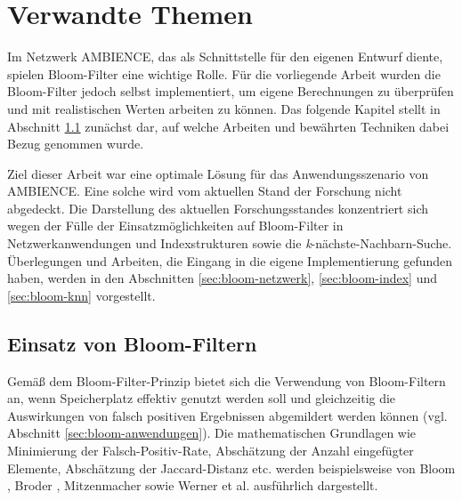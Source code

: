 \chapter{Verwandte Themen}\label{ch:related}
Im Netzwerk AMBIENCE, das als Schnittstelle für den eigenen Entwurf diente, spielen Bloom-Filter eine wichtige Rolle. Für die vorliegende Arbeit wurden die Bloom-Filter jedoch selbst implementiert, um eigene Berechnungen zu überprüfen und mit realistischen Werten arbeiten zu können. Das folgende Kapitel stellt in Abschnitt \ref{sec:bloom-implementierung} zunächst dar, auf welche Arbeiten und bewährten Techniken dabei Bezug genommen wurde. 

Ziel dieser Arbeit war eine optimale Lösung für das Anwendungsszenario von AMBIENCE. Eine solche wird vom aktuellen Stand der Forschung nicht abgedeckt. Die Darstellung des aktuellen Forschungsstandes konzentriert  sich wegen der Fülle der Einsatzmöglichkeiten auf Bloom-Filter in Netzwerkanwendungen und Indexstrukturen sowie die \textit{k}-nächste-Nachbarn-Suche. Überlegungen und Arbeiten, die Eingang in die eigene Implementierung gefunden haben, werden in den Abschnitten \ref{sec:bloom-netzwerk}, \ref{sec:bloom-index} und \ref{sec:bloom-knn} vorgestellt. 
\section{Einsatz von Bloom-Filtern}\label{sec:bloom-implementierung}
Gemäß dem Bloom-Filter-Prinzip bietet sich die Verwendung von Bloom-Filtern an, wenn Speicherplatz effektiv genutzt werden soll und gleichzeitig die Auswirkungen von falsch positiven Ergebnissen abgemildert werden können (vgl. Abschnitt \ref{sec:bloom-anwendungen}). Die mathematischen Grundlagen wie Minimierung der Falsch-Positiv-Rate, Abschätzung der Anzahl eingefügter Elemente, Abschätzung der Jaccard-Distanz etc. werden beispielsweise von Bloom \cite{Bloom1970}, Broder \cite{Broder2004}, Mitzenmacher \cite{Mitzenmacher2002} sowie Werner et al. \cite{Werner2015} ausführlich dargestellt. 

